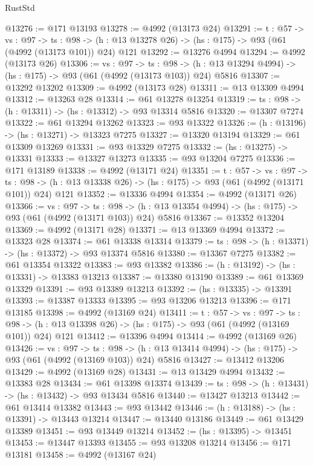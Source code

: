 \begin{lexlean}{RustStd}
\begin{coremodule}
@13276 := @171 @13193
@13278 := @4992 (@13173 @24)
@13291 := {t : @57} ->
  {vs : @97} ->
  {ts : @98} -> (h : @13 @13278 @26) -> (hs : @175) -> @93 (@61 (@4992 (@13173 @101)) @24) @121
@13292 := @13276 @4994
@13294 := @4992 (@13173 @26)
@13306 := {vs : @97} ->
  {ts : @98} -> (h : @13 @13294 @4994) -> (hs : @175) -> @93 (@61 (@4992 (@13173 @103)) @24) @5816
@13307 := @13292 @13202
@13309 := @4992 (@13173 @28)
@13311 := @13 @13309 @4994
@13312 := @13263 @28
@13314 := @61 @13278 @13254
@13319 := {ts : @98} -> (h : @13311) -> (hs : @13312) -> @93 @13314 @5816
@13320 := @13307 @7274
@13322 := @61 @13294 @13262
@13323 := @93 @13322
@13326 := (h : @13196) -> (hs : @13271) -> @13323 @7275
@13327 := @13320 @13194
@13329 := @61 @13309 @13269
@13331 := @93 @13329 @7275
@13332 := (hs : @13275) -> @13331
@13333 := @13327 @13273
@13335 := @93 @13204 @7275
@13336 := @171 @13189
@13338 := @4992 (@13171 @24)
@13351 := {t : @57} ->
  {vs : @97} ->
  {ts : @98} -> (h : @13 @13338 @26) -> (hs : @175) -> @93 (@61 (@4992 (@13171 @101)) @24) @121
@13352 := @13336 @4994
@13354 := @4992 (@13171 @26)
@13366 := {vs : @97} ->
  {ts : @98} -> (h : @13 @13354 @4994) -> (hs : @175) -> @93 (@61 (@4992 (@13171 @103)) @24) @5816
@13367 := @13352 @13204
@13369 := @4992 (@13171 @28)
@13371 := @13 @13369 @4994
@13372 := @13323 @28
@13374 := @61 @13338 @13314
@13379 := {ts : @98} -> (h : @13371) -> (hs : @13372) -> @93 @13374 @5816
@13380 := @13367 @7275
@13382 := @61 @13354 @13322
@13383 := @93 @13382
@13386 := (h : @13192) -> (hs : @13331) -> @13383 @13213
@13387 := @13380 @13190
@13389 := @61 @13369 @13329
@13391 := @93 @13389 @13213
@13392 := (hs : @13335) -> @13391
@13393 := @13387 @13333
@13395 := @93 @13206 @13213
@13396 := @171 @13185
@13398 := @4992 (@13169 @24)
@13411 := {t : @57} ->
  {vs : @97} ->
  {ts : @98} -> (h : @13 @13398 @26) -> (hs : @175) -> @93 (@61 (@4992 (@13169 @101)) @24) @121
@13412 := @13396 @4994
@13414 := @4992 (@13169 @26)
@13426 := {vs : @97} ->
  {ts : @98} -> (h : @13 @13414 @4994) -> (hs : @175) -> @93 (@61 (@4992 (@13169 @103)) @24) @5816
@13427 := @13412 @13206
@13429 := @4992 (@13169 @28)
@13431 := @13 @13429 @4994
@13432 := @13383 @28
@13434 := @61 @13398 @13374
@13439 := {ts : @98} -> (h : @13431) -> (hs : @13432) -> @93 @13434 @5816
@13440 := @13427 @13213
@13442 := @61 @13414 @13382
@13443 := @93 @13442
@13446 := (h : @13188) -> (hs : @13391) -> @13443 @13214
@13447 := @13440 @13186
@13449 := @61 @13429 @13389
@13451 := @93 @13449 @13214
@13452 := (hs : @13395) -> @13451
@13453 := @13447 @13393
@13455 := @93 @13208 @13214
@13456 := @171 @13181
@13458 := @4992 (@13167 @24)

\end{coremodule}
\end{lexlean}
